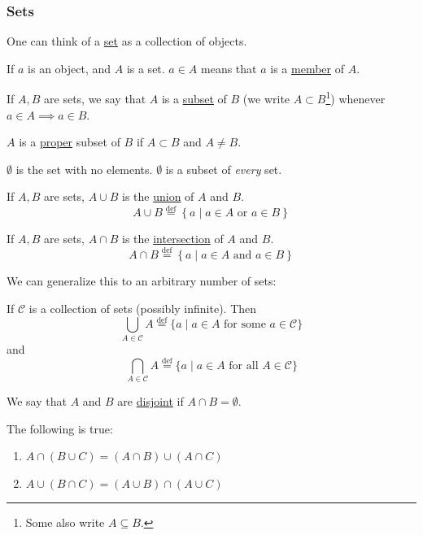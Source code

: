 \subsubsection{Sets}
\begin{definition}[Set]
    One can think of a \ul{set} as a collection of objects.

    If $a$ is an object, and $A$ is a set. $a\in A$ means that $a$ is a \ul{member} of $A$.
\end{definition}
\begin{definition}[Subsets]
    If $A, B$ are sets, we say that $A$ is a \ul{subset} of $B$ (we write $A\subset B$\footnote{Some also write $A\subseteq B$.}) whenever $a\in A\implies a\in B$.

    $A$ is a \ul{proper} subset of $B$ if $A\subset B$ and $A\neq B$.
\end{definition}
\begin{remark}
    $\emptyset$ is the set with no elements. $\emptyset$ is a subset of \emph{every} set.
\end{remark}
\begin{definition}[Union]
    If $A, B$ are sets, $A\cup B$ is the \ul{union} of $A$ and $B$.
    \[A\cup B \overset{\text{def}}{=}\left\{ a\mid a\in A \text{ or }a\in B \right\}\]
\end{definition}
\begin{definition}[Intersection]
    If $A, B$ are sets, $A\cap B$ is the \ul{intersection} of $A$ and $B$.
    \[A\cap B \overset{\text{def}}{=}\left\{ a\mid a\in A \text{ and }a\in B \right\}\]
\end{definition}
We can generalize this to an arbitrary number of sets:
\begin{definition}
    If $\mathcal{C}$ is a collection of sets (possibly infinite). Then
    \[\bigcup_{A\in \mathcal{C}}A \overset{\text{def}}{=} \{a\mid a\in A \text{ for some }a\in \mathcal{C}\}\]
    and
    \[\bigcap_{A\in \mathcal{C}}A \overset{\text{def}}{=} \{a\mid a\in A \text{ for all }A\in \mathcal{C}\}\]
\end{definition}
\begin{definition}[Disjunction]
    We say that $A$ and $B$ are \ul{disjoint} if $A\cap B = \emptyset$.
\end{definition}
\begin{proposition}
    The following is true:
    \begin{enumerate}
        \item $A\cap(B\cup C) = (A\cap B) \cup (A\cap C)$
        \item $A\cup(B\cap C) = (A\cup B) \cap (A\cup C)$
    \end{enumerate}
\end{proposition}
